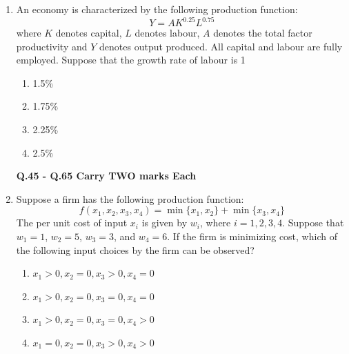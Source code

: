 \documentclass[journal,12pt,onecolumn]{exam}
\theoremstyle{remark}
\begin{document}
\begin{enumerate}
\item An economy is characterized by the following production function:
  \[
  Y = A K^{0.25} L^{0.75}
  \]
  where \(K\) denotes capital, \(L\) denotes labour, \(A\) denotes the total factor productivity and \(Y\) denotes output produced. All capital and labour are fully employed. Suppose that the growth rate of labour is 1%
  \begin{enumerate}
    \item 1.5\%
    \item 1.75\%
    \item 2.25\%
    \item 2.5\%
  \end{enumerate}

\newpage
\textbf{Q.45 - Q.65 Carry TWO marks Each}

\item Suppose a firm has the following production function:
  \[
  f(x_1, x_2, x_3, x_4) = \min\{x_1, x_2\} + \min\{x_3, x_4\}
  \]
  The per unit cost of input \(x_i\) is given by \(w_i\), where \(i = 1, 2, 3, 4\). Suppose that \(w_1 = 1\), \(w_2 = 5\), \(w_3 = 3\), and \(w_4 = 6\). If the firm is minimizing cost, which of the following input choices by the firm can be observed?
  \begin{enumerate}
    \item \(x_1 > 0, x_2 = 0, x_3 > 0, x_4 = 0\)
    \item \(x_1 > 0, x_2 = 0, x_3 = 0, x_4 = 0\)
    \item \(x_1 > 0, x_2 = 0, x_3 = 0, x_4 > 0\)
    \item \(x_1 = 0, x_2 = 0, x_3 > 0, x_4 > 0\)
  \end{enumerate}


\end{enumerate}
\end{document}
